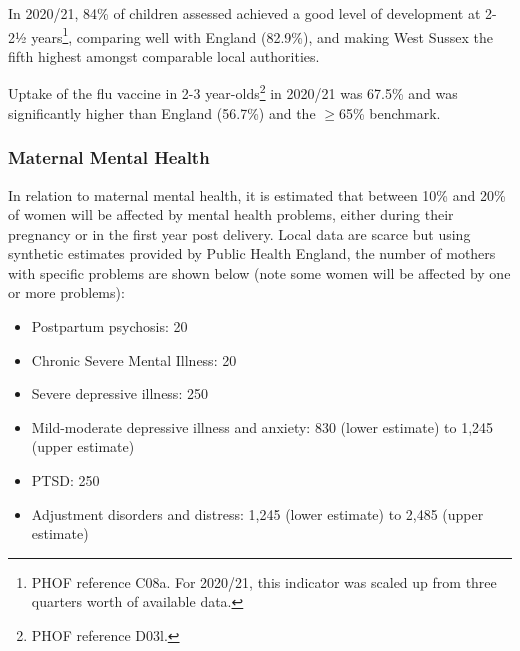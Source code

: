 In 2020/21, 84\% of children assessed achieved a good level of development at 2-2½ years\footnote{PHOF reference C08a. For 2020/21, this indicator was scaled up from three quarters worth of available data.}, comparing well with England (82.9\%), and making West Sussex the fifth highest amongst comparable local authorities.

Uptake of the flu vaccine in 2-3 year-olds\footnote{PHOF reference D03l.} in 2020/21 was 67.5\% and was significantly higher than England (56.7\%) and the $\geq$65\% benchmark.


\subsubsection{Maternal Mental Health} In relation to maternal mental health, it is estimated that between 10\% and 20\% of women will be affected by mental health problems, either during their pregnancy or in the first year post delivery. Local data are scarce but using synthetic estimates provided by Public Health England, the number of mothers with specific problems are shown below (note some women will be affected by one or more problems):
\begin{itemize}[noitemsep]
    \item Postpartum psychosis: 20 
    \item Chronic Severe Mental Illness: 20
    \item Severe depressive illness: 250 
    \item Mild-moderate depressive illness and anxiety: 830 (lower estimate) to 1,245 (upper estimate) 
    \item PTSD: 250 
    \item Adjustment disorders and distress: 1,245 (lower estimate) to 2,485 (upper estimate)
\end{itemize}

